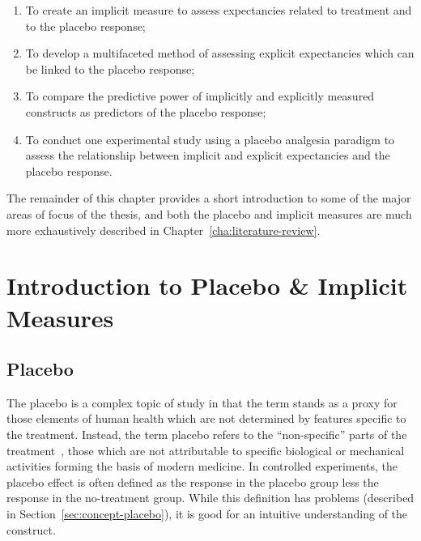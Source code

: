 \begin{enumerate}


\item To create an implicit measure to assess expectancies related to treatment and to the placebo response;

\item To develop a multifaceted method of assessing explicit expectancies which can be linked to the placebo response;

\item To compare the predictive power of implicitly and explicitly measured constructs as predictors of the placebo response;

\item To conduct one  experimental study using a placebo analgesia paradigm to assess the relationship between implicit and explicit expectancies and the placebo response.
\end{enumerate}

The remainder of this chapter provides a short introduction to some of the major areas of focus of the thesis, and both the placebo and implicit measures are much more exhaustively described in Chapter~\ref{cha:literature-review}. 


\section{Introduction to Placebo \& Implicit Measures}
\label{sec:intr-plac-impl-meas}

\subsection{Placebo}
\label{sec:placebo}

The placebo is a complex topic of study in that the term stands as a proxy for those elements of human health which are not determined by  features specific to the treatment. Instead, the term placebo refers to the ``non-specific'' parts of the treatment~\cite{grunbaum1981placebo}, those which are not attributable to  specific biological or mechanical activities forming the basis of modern medicine. In controlled experiments, the placebo effect is often defined as the response in the placebo group less the response in the no-treatment group. While this definition has problems (described in Section~\ref{sec:concept-placebo}), it is good for an intuitive understanding of the construct. 

